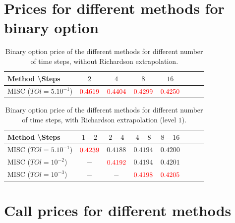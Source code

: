 \documentclass[11pt]{article}
\begin{document}
 \newpage

 


\appendix


\section{ Prices for different methods for binary option }\label{appendix:Call prices for different methods_binary}

\begin{table}[h!]
	\centering
	\begin{tabular}{l*{6}{c}r}
		Method \textbackslash  Steps            & $2$ & $4$ & $8$ & $16$ &   \\
		\hline
		MISC ($TOl=5.10^{-1}$)  & ${\color{red}0.4619}$ & $  {\color{red}0.4404}$ & ${\color{red}0.4299}$ & ${\color{red}0.4250}$  \\
		\hline
	\end{tabular}
	\caption{ Binary option price of the different methods for different number of time steps, without Richardson extrapolation.}
	\label{table: Binary option price of the different methods for different number of time steps}
\end{table}


\begin{table}[h!]
	\centering
	\begin{tabular}{l*{6}{c}r}
		Method \textbackslash  Steps   &$1-2$         & $2-4$ & $4-8$ & $8-16$  \\
		\hline
		MISC ($TOl=5.10^{-1}$) & ${\color{red}0.4239}$ & $0.4188$ & $  0.4194$ & $0.4200$   \\
			MISC ($TOl=10^{-2}$) & $-$ & ${\color{red}0.4192}$ & $  0.4194$ & $0.4201$   \\
			MISC ($TOl=10^{-3}$) & $-$ & $-$ & $  {\color{red}0.4198}$ & ${\color{red}0.4205}$   \\
		\hline
	\end{tabular}
	\caption{Binary  option price of the different methods for different number of time steps, with Richardson extrapolation (level $1$).}
	\label{table: Binary option price of the different methods for different number of time steps, binary option, with richardson, level 1}
\end{table}

\newpage


\section{ Call prices for different methods}\label{appendix:Call prices for different methods}
\end{document}

